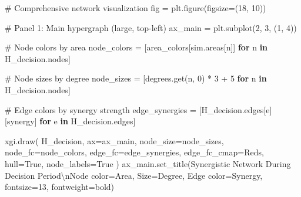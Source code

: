\documentclass[
  11pt,
  letterpaper,
  oneside,
  openany]{book}
\newenvironment{Shaded}{\begin{snugshade}}{\end{snugshade}}
\newcommand{\CharTok}[1]{\textcolor[rgb]{0.13,0.47,0.30}{#1}}
\newcommand{\CommentTok}[1]{\textcolor[rgb]{0.37,0.37,0.37}{#1}}
\newcommand{\ControlFlowTok}[1]{\textcolor[rgb]{0.00,0.23,0.31}{\textbf{#1}}}
\newcommand{\DecValTok}[1]{\textcolor[rgb]{0.68,0.00,0.00}{#1}}
\newcommand{\KeywordTok}[1]{\textcolor[rgb]{0.00,0.23,0.31}{\textbf{#1}}}
\newcommand{\NormalTok}[1]{\textcolor[rgb]{0.00,0.23,0.31}{#1}}
\newcommand{\OperatorTok}[1]{\textcolor[rgb]{0.37,0.37,0.37}{#1}}
\newcommand{\StringTok}[1]{\textcolor[rgb]{0.13,0.47,0.30}{#1}}
\newcommand{\VariableTok}[1]{\textcolor[rgb]{0.07,0.07,0.07}{#1}}
\begin{document}
\begin{Shaded}
\begin{Highlighting}[]
\CommentTok{\# Comprehensive network visualization}
\NormalTok{fig }\OperatorTok{=}\NormalTok{ plt.figure(figsize}\OperatorTok{=}\NormalTok{(}\DecValTok{18}\NormalTok{, }\DecValTok{10}\NormalTok{))}

\CommentTok{\# Panel 1: Main hypergraph (large, top{-}left)}
\NormalTok{ax\_main }\OperatorTok{=}\NormalTok{ plt.subplot(}\DecValTok{2}\NormalTok{, }\DecValTok{3}\NormalTok{, (}\DecValTok{1}\NormalTok{, }\DecValTok{4}\NormalTok{))}

\CommentTok{\# Node colors by area}
\NormalTok{node\_colors }\OperatorTok{=}\NormalTok{ [area\_colors[sim.areas[n]] }\ControlFlowTok{for}\NormalTok{ n }\KeywordTok{in}\NormalTok{ H\_decision.nodes]}

\CommentTok{\# Node sizes by degree}
\NormalTok{node\_sizes }\OperatorTok{=}\NormalTok{ [degrees.get(n, }\DecValTok{0}\NormalTok{) }\OperatorTok{*} \DecValTok{3} \OperatorTok{+} \DecValTok{5} \ControlFlowTok{for}\NormalTok{ n }\KeywordTok{in}\NormalTok{ H\_decision.nodes]}

\CommentTok{\# Edge colors by synergy strength}
\NormalTok{edge\_synergies }\OperatorTok{=}\NormalTok{ [H\_decision.edges[e][}\StringTok{\textquotesingle{}synergy\textquotesingle{}}\NormalTok{] }\ControlFlowTok{for}\NormalTok{ e }\KeywordTok{in}\NormalTok{ H\_decision.edges]}

\NormalTok{xgi.draw(}
\NormalTok{    H\_decision,}
\NormalTok{    ax}\OperatorTok{=}\NormalTok{ax\_main,}
\NormalTok{    node\_size}\OperatorTok{=}\NormalTok{node\_sizes,}
\NormalTok{    node\_fc}\OperatorTok{=}\NormalTok{node\_colors,}
\NormalTok{    edge\_fc}\OperatorTok{=}\NormalTok{edge\_synergies,}
\NormalTok{    edge\_fc\_cmap}\OperatorTok{=}\StringTok{\textquotesingle{}Reds\textquotesingle{}}\NormalTok{,}
\NormalTok{    hull}\OperatorTok{=}\VariableTok{True}\NormalTok{,}
\NormalTok{    node\_labels}\OperatorTok{=}\VariableTok{True}
\NormalTok{)}
\NormalTok{ax\_main.set\_title(}\StringTok{\textquotesingle{}Synergistic Network During Decision Period}\CharTok{\textbackslash{}n}\StringTok{Node color=Area, Size=Degree, Edge color=Synergy\textquotesingle{}}\NormalTok{, }
\NormalTok{                 fontsize}\OperatorTok{=}\DecValTok{13}\NormalTok{, fontweight}\OperatorTok{=}\StringTok{\textquotesingle{}bold\textquotesingle{}}\NormalTok{)}


\end{Highlighting}
\end{Shaded}
\end{document}
